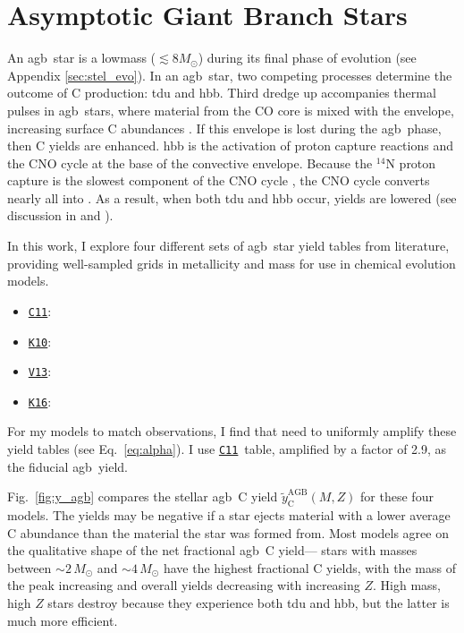 \documentclass[12pt,oneside,letterpaper]{report}
\newcommand{\agb}{\gls{agb}}
\newcommand{\cxi}{\texttt{\hyperlink{C11}{C11}}}
\newcommand{\kx}{\texttt{\hyperlink{K10}{K10}}}
\newcommand{\kxvi}{\texttt{\hyperlink{K16}{K16}}}
\newcommand{\vxiii}{\texttt{\hyperlink{V13}{V13}}}
\newcommand{\sun}{\odot}
\newcommand{\about}[1]{${\sim} #1$}
\begin{document}
\section{Asymptotic Giant Branch Stars}\label{sec:agb}


An \agb\ star is a \gls{lowmass} ($\lesssim 8 M_{\sun}$) during its final phase of evolution (see Appendix \ref{sec:stel_evo}).  In an \agb\ star, two competing processes determine the outcome of C production: \gls{tdu} and \gls{hbb}.  Third dredge up accompanies thermal pulses in \agb\ stars, where material from the CO core is mixed with the envelope, increasing surface C abundances \citep{KL14}. If this envelope is lost during the \agb\ phase, then C yields are enhanced.
\Gls{hbb} is the activation of proton capture reactions and the CNO cycle 
at the base of the convective envelope. Because the $^{14}$N proton capture is the slowest component of the CNO cycle \citep{solar-fusion}, the CNO cycle converts nearly all  into .
As a result, when both \gls{tdu} and \gls{hbb} occur,  yields are lowered (see discussion in \citealt{james+23} and \citealt{ventura+13}).

    In this work, I explore four different sets of \agb\ star yield tables from literature, providing well-sampled grids in \gls{metallicity} and mass for use in chemical evolution models. 
\begin{itemize}
    \item \cxi: \citet{cristallo+11, cristallo+15}
    \item \kx: \citet{karakas10}
    \item \vxiii: \citet{ventura+13,ventura+14,ventura+18, ventura+20}
    \item \kxvi: \citet{KL16, karakas+18}
\end{itemize}
For my models to match observations, I find that need to uniformly amplify these yield tables (see Eq.~\ref{eq:alpha}). I use \cxi\ table, amplified by a factor of 2.9, as the fiducial \agb\ yield.

Fig.~\ref{fig:y_agb} compares the stellar \agb\ C yield $\tilde{y}_\text{C}^\text{AGB}(M, Z)$ for these four models.
The yields may be negative if a star ejects material with a lower average C abundance than the material the star was formed from.
Most models agree on the qualitative shape of the net fractional \agb\ C yield---%
stars with masses between \about{2\,M_\odot} and \about{4\,M_\odot} have the highest fractional C yields, with the mass of the peak increasing and overall yields decreasing with increasing $Z$.  High mass, high $Z$ stars destroy  because they experience both \gls{tdu} and \gls{hbb}, but the latter is much more efficient.
\end{document}
